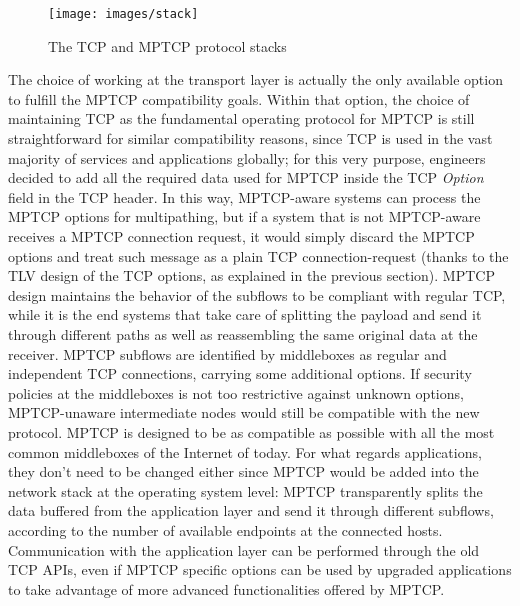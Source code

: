 \begin{figure}[!htb]
\centering
\texttt{[image: images/stack]}
\caption{The TCP and MPTCP protocol stacks}
\label{fig:stack}
\end{figure}

The choice of working at the transport layer is actually the only available option to fulfill the MPTCP compatibility goals. Within that option, the choice of maintaining TCP as the fundamental operating protocol for MPTCP is still straightforward for similar compatibility reasons, since TCP is used in the vast majority of services and applications globally; for this very purpose, engineers decided to add all the required data used for MPTCP inside the TCP \textit{Option} field in the TCP header. In this way, MPTCP-aware systems can process the MPTCP options for multipathing, but if a system that is not MPTCP-aware receives a MPTCP connection request, it would simply discard the MPTCP options and treat such message as a plain TCP connection-request (thanks to the TLV design of the TCP options, as explained in the previous section). 
MPTCP design maintains the behavior of the subflows to be compliant with regular TCP, while it is the end systems that take care of splitting the payload and send it through different paths as well as reassembling the same original data at the receiver. MPTCP subflows are identified by middleboxes as regular and independent TCP connections, carrying some additional options. If security policies at the middleboxes is not too restrictive against unknown options, MPTCP-unaware intermediate nodes would still be compatible with the new protocol. MPTCP is designed to be as compatible as possible with all the most common middleboxes of the Internet of today.
For what regards applications, they don't need to be changed either since MPTCP would be added into the network stack at the operating system level: MPTCP transparently splits the data buffered from the application layer and send it through different subflows, according to the number of available endpoints at the connected hosts. Communication with the application layer can be performed through the old TCP APIs, even if MPTCP specific options can be used by upgraded applications to take advantage of more advanced functionalities offered by MPTCP.

